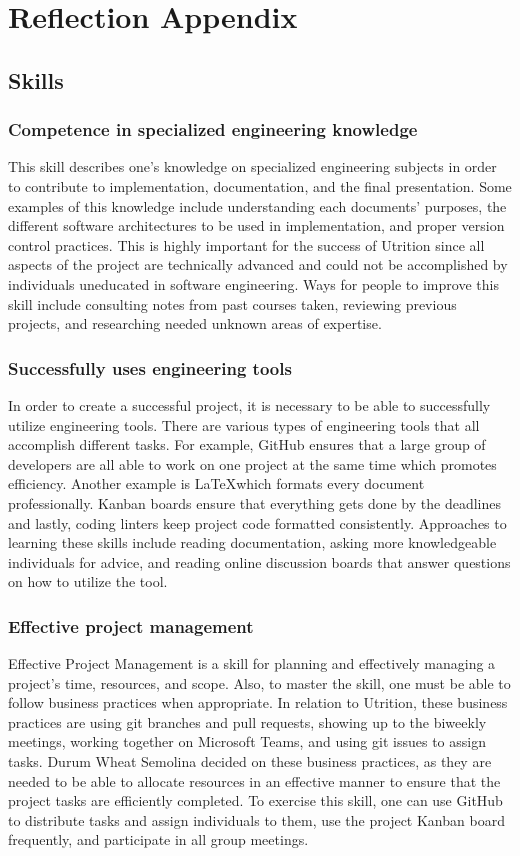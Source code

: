 \documentclass[12pt]{article}
\begin{document}
\section{Reflection Appendix}
\subsection{Skills}
\subsubsection{Competence in specialized engineering knowledge}
This skill describes one's knowledge on specialized engineering subjects in order to contribute to implementation, documentation, and the final presentation. Some examples of this knowledge include understanding each documents' purposes, the different software architectures to be used in implementation, and proper version control practices. This is highly important for the success of Utrition since all aspects of the project are technically advanced and could not be accomplished by individuals uneducated in software engineering. Ways for people to improve this skill include consulting notes from past courses taken, reviewing previous projects, and researching needed unknown areas of expertise.

\subsubsection{Successfully uses engineering tools}
In order to create a successful project, it is necessary to be able to successfully utilize engineering tools. There are various types of engineering tools that all accomplish different tasks. For example, GitHub ensures that a large group of developers are all able to work on one project at the same time which promotes efficiency. Another example is \LaTeX which formats every document professionally. Kanban boards ensure that everything gets done by the deadlines and lastly, coding linters keep project code formatted consistently. Approaches to learning these skills include reading documentation, asking more knowledgeable individuals for advice, and reading online discussion boards that answer questions on how to utilize the tool. 

\subsubsection{Effective project management}
Effective Project Management is a skill for planning and effectively managing a project’s time, resources, and scope. Also, to master the skill, one must be able to follow business practices when appropriate. In relation to Utrition, these business practices are using git branches and pull requests, showing up to the biweekly meetings, working together on Microsoft Teams, and using git issues to assign tasks. Durum Wheat Semolina decided on these business practices, as they are needed to be able to allocate resources in an effective manner to ensure that the project tasks are efficiently completed. To exercise this skill, one can use GitHub to distribute tasks and assign individuals to them, use the project Kanban board frequently, and participate in all group meetings.
\end{document}
